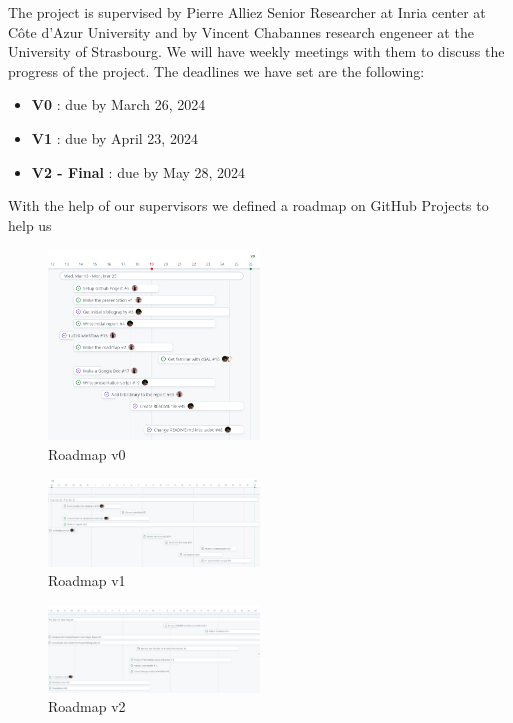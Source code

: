 \documentclass[12pt]{article}
\begin{document}
The project is supervised by Pierre Alliez
Senior Researcher at Inria center at Côte d'Azur University
and by Vincent Chabannes research engeneer at the University of Strasbourg.
We will have weekly meetings with them to discuss the progress of the project.
The deadlines we have set are the following:
\begin{itemize}
    \item \textbf{V0} : due by March 26, 2024
    \item \textbf{V1} : due by April 23, 2024
    \item \textbf{V2 - Final} : due by May 28, 2024
\end{itemize}

With the help of our supervisors we defined a roadmap on GitHub Projects
to help us

\begin{figure}[h]
    \centering
    \includegraphics[width=0.5\textwidth]{images/roadmap_v0.png}
    \caption{Roadmap v0}
\end{figure}

\begin{figure}[h]
    \centering
    \includegraphics[width=0.5\textwidth]{images/roadmap_v1.png}
    \caption{Roadmap v1}
\end{figure}

\begin{figure}[h]
    \centering
    \includegraphics[width=0.5\textwidth]{images/roadmap_v2.png}
    \caption{Roadmap v2}
\end{figure}
\end{document}
